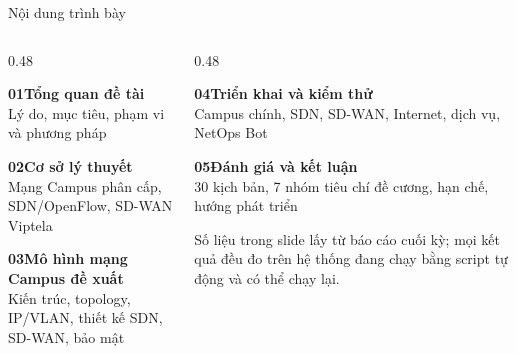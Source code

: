 \documentclass[aspectratio=169, 10pt, xcolor={table}]{beamer}
\begin{document}
\begin{frame}{Nội dung trình bày}
    \vspace{0.15cm}
    \begin{columns}[T]
        \begin{column}{0.48\textwidth}
            \begin{softcard}\textbf{\color{brand}01}\quad \textbf{Tổng quan đề tài}\\
                {\scriptsize\color{inkSoft}Lý do, mục tiêu, phạm vi và phương pháp}\end{softcard}
            \begin{softcard}\textbf{\color{brand}02}\quad \textbf{Cơ sở lý thuyết}\\
                {\scriptsize\color{inkSoft}Mạng Campus phân cấp, SDN/OpenFlow, SD-WAN Viptela}\end{softcard}
            \begin{softcard}\textbf{\color{brand}03}\quad \textbf{Mô hình mạng Campus đề xuất}\\
                {\scriptsize\color{inkSoft}Kiến trúc, topology, IP/VLAN, thiết kế SDN, SD-WAN, bảo mật}\end{softcard}
        \end{column}
        \begin{column}{0.48\textwidth}
            \begin{softcard}\textbf{\color{brand}04}\quad \textbf{Triển khai và kiểm thử}\\
                {\scriptsize\color{inkSoft}Campus chính, SDN, SD-WAN, Internet, dịch vụ, NetOps Bot}\end{softcard}
            \begin{softcard}\textbf{\color{brand}05}\quad \textbf{Đánh giá và kết luận}\\
                {\scriptsize\color{inkSoft}30 kịch bản, 7 nhóm tiêu chí đề cương, hạn chế, hướng phát triển}\end{softcard}
            \begin{softcard}[accentSoft]\scriptsize
                Số liệu trong slide lấy từ báo cáo cuối kỳ; mọi kết quả đều đo trên hệ thống đang chạy
                bằng script tự động và có thể chạy lại.\end{softcard}
        \end{column}
    \end{columns}
\end{frame}

\end{document}

